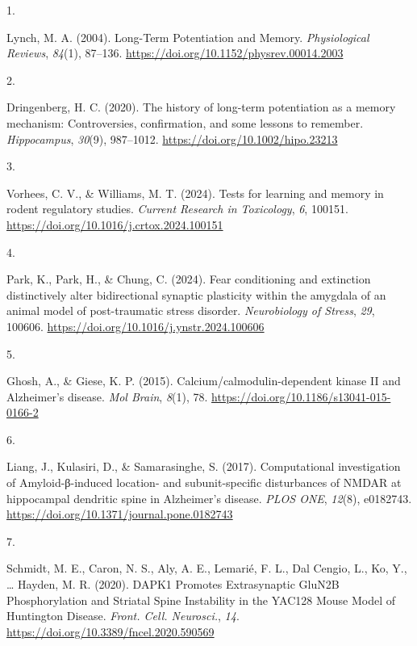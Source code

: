 \documentclass[
  11pt,
  letterpaper,
]{scrreprt}
\newlength{\cslhangindent}
\newlength{\csllabelwidth}
\newenvironment{CSLReferences}[2] %
 {\begin{list}{}{%
  \setlength{\itemindent}{0pt}
  \setlength{\leftmargin}{0pt}
  \setlength{\parsep}{0pt}
  \ifodd #1
   \setlength{\leftmargin}{\cslhangindent}
   \setlength{\itemindent}{-1\cslhangindent}
  \fi
  \setlength{\itemsep}{#2\baselineskip}}}
 {\end{list}}
\newcommand{\CSLLeftMargin}[1]{\parbox[t]{\csllabelwidth}{\strut#1\strut}}
\newcommand{\CSLRightInline}[1]{\parbox[t]{\linewidth - \csllabelwidth}{\strut#1\strut}}
\begin{document}

\label{refs}
\begin{CSLReferences}{0}{0}
\CSLLeftMargin{1. }%
\CSLRightInline{Lynch, M. A. (2004). Long-{Term Potentiation} and
{Memory}. \emph{Physiological Reviews}, \emph{84}(1), 87--136.
\url{https://doi.org/10.1152/physrev.00014.2003}}

\CSLLeftMargin{2. }%
\CSLRightInline{Dringenberg, H. C. (2020). The history of long-term
potentiation as a memory mechanism: {Controversies}, confirmation, and
some lessons to remember. \emph{Hippocampus}, \emph{30}(9), 987--1012.
\url{https://doi.org/10.1002/hipo.23213}}

\CSLLeftMargin{3. }%
\CSLRightInline{Vorhees, C. V., \& Williams, M. T. (2024). Tests for
learning and memory in rodent regulatory studies. \emph{Current Research
in Toxicology}, \emph{6}, 100151.
\url{https://doi.org/10.1016/j.crtox.2024.100151}}

\CSLLeftMargin{4. }%
\CSLRightInline{Park, K., Park, H., \& Chung, C. (2024). Fear
conditioning and extinction distinctively alter bidirectional synaptic
plasticity within the amygdala of an animal model of post-traumatic
stress disorder. \emph{Neurobiology of Stress}, \emph{29}, 100606.
\url{https://doi.org/10.1016/j.ynstr.2024.100606}}

\CSLLeftMargin{5. }%
\CSLRightInline{Ghosh, A., \& Giese, K. P. (2015).
Calcium/calmodulin-dependent kinase {II} and {Alzheimer}'s disease.
\emph{Mol Brain}, \emph{8}(1), 78.
\url{https://doi.org/10.1186/s13041-015-0166-2}}

\CSLLeftMargin{6. }%
\CSLRightInline{Liang, J., Kulasiri, D., \& Samarasinghe, S. (2017).
Computational investigation of {Amyloid-β-induced} location- and
subunit-specific disturbances of {NMDAR} at hippocampal dendritic spine
in {Alzheimer}'s disease. \emph{PLOS ONE}, \emph{12}(8), e0182743.
\url{https://doi.org/10.1371/journal.pone.0182743}}

\CSLLeftMargin{7. }%
\CSLRightInline{Schmidt, M. E., Caron, N. S., Aly, A. E., Lemarié, F.
L., Dal Cengio, L., Ko, Y., \ldots{} Hayden, M. R. (2020). {DAPK1
Promotes Extrasynaptic GluN2B Phosphorylation} and {Striatal Spine
Instability} in the {YAC128 Mouse Model} of {Huntington Disease}.
\emph{Front. Cell. Neurosci.}, \emph{14}.
\url{https://doi.org/10.3389/fncel.2020.590569}}


\end{CSLReferences}
\end{document}
